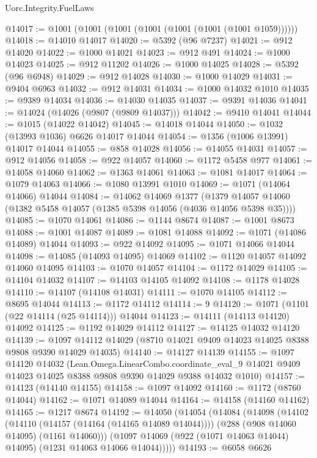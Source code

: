 \begin{lexlean}{Uorc.Integrity.FuelLaws}
\begin{coremodule}
@14017 := @1001 (@1001 (@1001 (@1001 (@1001 (@1001 (@1001 @1059))))))
@14018 := @14010 @14017
@14020 := @5392 (@96 @7237)
@14021 := @912 @14020
@14022 := @1000 @14021
@14023 := @912 @491
@14024 := @1000 @14023
@14025 := @912 @11202
@14026 := @1000 @14025
@14028 := @5392 (@96 @6948)
@14029 := @912 @14028
@14030 := @1000 @14029
@14031 := @9404 @6963
@14032 := @912 @14031
@14034 := @1000 @14032 @1010
@14035 := @9389 @14034
@14036 := @14030 @14035
@14037 := @9391 @14036
@14041 := @14024 (@14026 (@9807 (@9809 @14037)))
@14042 := @9410 @14041
@14044 := @1015 (@14022 @14042)
@14045 := @14018 @14044
@14050 := @1032 (@13993 @1036) @6626 @14017 @14044
@14054 := @1356 (@1006 @13991) @14017 @14044
@14055 := @858 @14028
@14056 := @14055 @14031
@14057 := @912 @14056
@14058 := @922 @14057
@14060 := @1172 @5458 @977
@14061 := @14058 @14060
@14062 := @1363 @14061
@14063 := @1081 @14017
@14064 := @1079 @14063
@14066 := @1080 @13991 @1010
@14069 := @1071 (@14064 @14066) @14044
@14084 := @14062
    @14069
    @1377
    (@1379 @14057 @14060 (@1382 @5458 @14057 (@1385 @5398 @14056 (@4036 @14056 @5398 @35))))
@14085 := @1070 @14061
@14086 := @1144 @8674
@14087 := @1001 @8673
@14088 := @1001 @14087
@14089 := @1081 @14088
@14092 := @1071 (@14086 @14089) @14044
@14093 := @922 @14092
@14095 := @1071 @14066 @14044
@14098 := @14085 (@14093 @14095) @14069
@14102 := @1120 @14057 @14092 @14060 @14095
@14103 := @1070 @14057
@14104 := @1172 @14029
@14105 := @14104 @14032
@14107 := @14103 @14105 @14092
@14108 := @1178 @14028
@14110 := @14107 (@14108 @14031)
@14111 := @1070 @14105
@14112 := @8695 @14044
@14113 := @1172 @14112
@14114 := 9
@14120 := @1071 (@1101 (@22 @14114 (@25 @14114))) @14044
@14123 := @14111 (@14113 @14120) @14092
@14125 := @1192 @14029 @14112
@14127 := @14125 @14032 @14120
@14139 := @1097 @14112 @14029 (@8710 @14021 @9409 @14023 @14025 @8388 @9808 @9390 @14029 @14035)
@14140 := @14127 @14139
@14155 := @1097
    @14120
    @14032
    (Lean.Omega.LinearCombo.coordinate_eval_9
      @14021
      @9409
      @14023
      @14025
      @8388
      @9808
      @9390
      @14029
      @9388
      @14032
      @1010)
@14157 := @14123 (@14140 @14155)
@14158 := @1097 @14092
@14160 := @1172 (@8760 @14044)
@14162 := @1071 @14089 @14044
@14164 := @14158 (@14160 @14162)
@14165 := @1217 @8674
@14192 := @14050
    (@14054
      (@14084
        (@14098
          (@14102
            (@14110 (@14157 (@14164 (@14165 @14089 @14044))))
            (@288 (@908 @14060 @14095) (@1161 @14060)))
          (@1097 @14069 (@922 (@1071 @14063 @14044) @14095) (@1231 @14063 @14066 @14044)))))
@14193 := @6058 @6626

\end{coremodule}
\end{lexlean}
